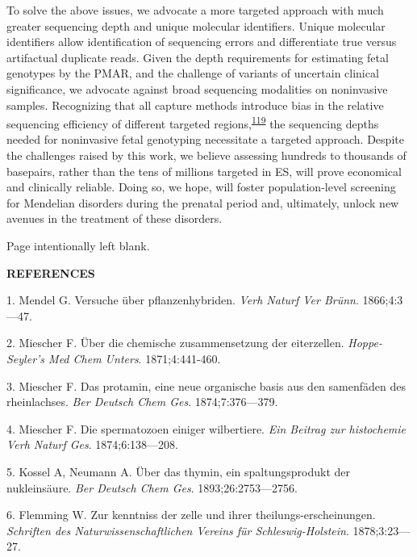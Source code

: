 \documentclass[11pt,letterpaper]{book}
\makeatletter
\newcommand*{\blankpage}{%
\vspace*{\fill}
{\centering Page intentionally left blank. \par}
\vspace{\fill}}
\renewcommand*{\cleardoublepage}{\clearpage\if@twoside \ifodd\c@page\else
\blankpage
\thispagestyle{empty}
\newpage
\if@twocolumn\hbox{}\newpage\fi\fi\fi}
\newcommand{\myonein}[1]{
\begin{center}
\bfseries\Large\MakeUppercase{#1}
\end{center}
}
\makeatother
\begin{document}
To solve the above issues, we advocate a more targeted approach with much greater sequencing depth and unique molecular identifiers.
Unique molecular identifiers allow identification of sequencing errors and differentiate true versus artifactual duplicate reads.
Given the depth requirements for estimating fetal genotypes by the PMAR, and the challenge of variants of uncertain clinical significance, we advocate against broad sequencing modalities on noninvasive samples.
Recognizing that all capture methods introduce bias in the relative sequencing efficiency of different targeted regions,\textsuperscript{\protect\hyperlink{ref-seaby:2016aa}{119}} the sequencing depths needed for noninvasive fetal genotyping necessitate a targeted approach.
Despite the challenges raised by this work, we believe assessing hundreds to thousands of basepairs, rather than the tens of millions targeted in ES, will prove economical and clinically reliable.
Doing so, we hope, will foster population-level screening for Mendelian disorders during the prenatal period and, ultimately, unlock new avenues in the treatment of these disorders.

\backmatter

\setlength{\parindent}{0ex}
\cleardoublepage
{}
{}
\myonein{REFERENCES}

\hypertarget{refs}{}
\leavevmode\hypertarget{ref-mendel:1866aa}{}%
1. Mendel G. Versuche über pflanzenhybriden. \emph{Verh Naturf Ver Brünn}. 1866;4:3---47.

\leavevmode\hypertarget{ref-miescher:1871aa}{}%
2. Miescher F. Über die chemische zusammensetzung der eiterzellen. \emph{Hoppe-Seyler's Med Chem Unters}. 1871;4:441-460.

\leavevmode\hypertarget{ref-miescher:1874aa}{}%
3. Miescher F. Das protamin, eine neue organische basis aus den samenfäden des rheinlachses. \emph{Ber Deutsch Chem Ges}. 1874;7:376---379.

\leavevmode\hypertarget{ref-miescher:1874ab}{}%
4. Miescher F. Die spermatozoen einiger wilbertiere. \emph{Ein Beitrag zur histochemie Verh Naturf Ges}. 1874;6:138---208.

\leavevmode\hypertarget{ref-kossel:1893aa}{}%
5. Kossel A, Neumann A. Über das thymin, ein spaltungsprodukt der nukleinsäure. \emph{Ber Deutsch Chem Ges}. 1893;26:2753---2756.

\leavevmode\hypertarget{ref-flemming:1878aa}{}%
6. Flemming W. Zur kenntniss der zelle und ihrer theilungs-erscheinungen. \emph{Schriften des Naturwissenschaftlichen Vereins für Schleswig-Holstein}. 1878;3:23---27.
\end{document}
